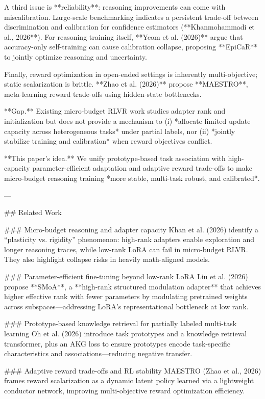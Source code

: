 A third issue is **reliability**: reasoning improvements can come with miscalibration. Large-scale benchmarking indicates a persistent trade-off between discrimination and calibration for confidence estimators (**Khanmohammadi et al., 2026**). For reasoning training itself, **Yeom et al. (2026)** argue that accuracy-only self-training can cause calibration collapse, proposing **EpiCaR** to jointly optimize reasoning and uncertainty.

Finally, reward optimization in open-ended settings is inherently multi-objective; static scalarization is brittle. **Zhao et al. (2026)** propose **MAESTRO**, meta-learning reward trade-offs using hidden-state bottlenecks.

**Gap.** Existing micro-budget RLVR work studies adapter rank and initialization but does not provide a mechanism to (i) *allocate limited update capacity across heterogeneous tasks* under partial labels, nor (ii) *jointly stabilize training and calibration* when reward objectives conflict.

**This paper’s idea.** We unify prototype-based task association with high-capacity parameter-efficient adaptation and adaptive reward trade-offs to make micro-budget reasoning training *more stable, multi-task robust, and calibrated*.

---

## Related Work  

### Micro-budget reasoning and adapter capacity  
Khan et al. (2026) identify a “plasticity vs. rigidity” phenomenon: high-rank adapters enable exploration and longer reasoning traces, while low-rank LoRA can fail in micro-budget RLVR. They also highlight collapse risks in heavily math-aligned models.

### Parameter-efficient fine-tuning beyond low-rank LoRA  
Liu et al. (2026) propose **SMoA**, a **high-rank structured modulation adapter** that achieves higher effective rank with fewer parameters by modulating pretrained weights across subspaces—addressing LoRA’s representational bottleneck at low rank.

### Prototype-based knowledge retrieval for partially labeled multi-task learning  
Oh et al. (2026) introduce task prototypes and a knowledge retrieval transformer, plus an AKG loss to ensure prototypes encode task-specific characteristics and associations—reducing negative transfer.

### Adaptive reward trade-offs and RL stability  
MAESTRO (Zhao et al., 2026) frames reward scalarization as a dynamic latent policy learned via a lightweight conductor network, improving multi-objective reward optimization efficiency.

